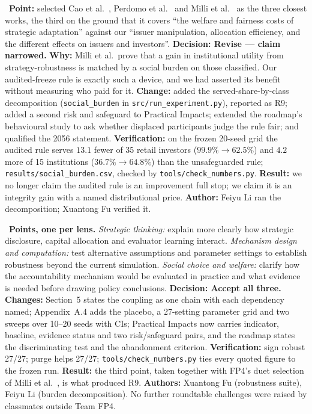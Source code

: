\begin{description}[leftmargin=0pt,labelsep=4pt,style=unboxed,itemsep=4pt]
\item[\textbf{Team FP4 --- Zhengjun He and Yichen Shen, Oct 12 duet}]\ \textbf{Point:} selected Cao et al.~\cite{cao2023machine}, Perdomo et al.~\cite{perdomo2020} and Milli et al.~\cite{milli2019} as the three closest works, the third on the ground that it covers ``the welfare and fairness costs of strategic adaptation'' against our ``issuer manipulation, allocation efficiency, and the different effects on issuers and investors''. \textbf{Decision: Revise --- claim narrowed.} \textbf{Why:} Milli et al.\ prove that a gain in institutional utility from strategy-robustness is matched by a social burden on those classified. Our audited-freeze rule is exactly such a device, and we had asserted its benefit without measuring who paid for it. \textbf{Change:} added the served-share-by-class decomposition (\texttt{social\_burden} in \texttt{src/run\_experiment.py}), reported as R9; added a second risk and safeguard to Practical Impacts; extended the roadmap's behavioural study to ask whether displaced participants judge the rule fair; and qualified the 2056 statement. \textbf{Verification:} on the frozen 20-seed grid the audited rule serves $13.1$ fewer of 35 retail investors ($99.9\%\to62.5\%$) and $4.2$ more of 15 institutions ($36.7\%\to64.8\%$) than the unsafeguarded rule; \texttt{results/social\_burden.csv}, checked by \texttt{tools/check\_numbers.py}. \textbf{Result:} we no longer claim the audited rule is an improvement full stop; we claim it is an integrity gain with a named distributional price. \textbf{Author:} Feiyu Li ran the decomposition; Xuantong Fu verified it.
\item[\textbf{Oct 14--15 roundtable and class thread --- Zhengjun He and Yichen Shen (Team FP4)}]\ \textbf{Points, one per lens.} \emph{Strategic thinking:} explain more clearly how strategic disclosure, capital allocation and evaluator learning interact. \emph{Mechanism design and computation:} test alternative assumptions and parameter settings to establish robustness beyond the current simulation. \emph{Social choice and welfare:} clarify how the accountability mechanism would be evaluated in practice and what evidence is needed before drawing policy conclusions. \textbf{Decision: Accept all three.} \textbf{Changes:} Section~5 states the coupling as one chain with each dependency named; Appendix~A.4 adds the placebo, a 27-setting parameter grid and two sweeps over 10--20 seeds with CIs; Practical Impacts now carries indicator, baseline, evidence status and two risk/safeguard pairs, and the roadmap states the discriminating test and the abandonment criterion. \textbf{Verification:} sign robust 27/27; purge helps 27/27; \texttt{tools/check\_numbers.py} ties every quoted figure to the frozen run. \textbf{Result:} the third point, taken together with FP4's duet selection of Milli et al.~\cite{milli2019}, is what produced R9. \textbf{Authors:} Xuantong Fu (robustness suite), Feiyu Li (burden decomposition). No further roundtable challenges were raised by classmates outside Team FP4.
\end{description}\endgroup

